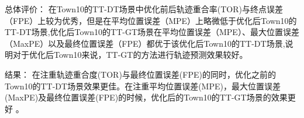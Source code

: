 总体评价：
在Town10的TT-DT场景中优化前后轨迹重合率(TOR)与终点误差（FPE）上较为优秀，但是在平均位置误差（MPE）上略微低于优化后Town10的TT-DT场景,优化后Town10的TT-GT场景在平均位置误差（MPE）、最大位置误差（MaxPE）以及最终位置误差（FPE）都优于该优化后Town10的TT-DT场景,说明对于优化后Town10来说，TT-GT的方法进行轨迹预测效果较好。

结果：
在注重轨迹重合度(TOR)与最终位置误差(FPE)的同时，优化之前的Town10的TT-DT场景效果更佳。在注重平均位置误差(MPE)，最大位置误差(MaxPE)及最终位置误差(FPE)的时候，优化后的Town10的TT-GT场景的效果更好 。












